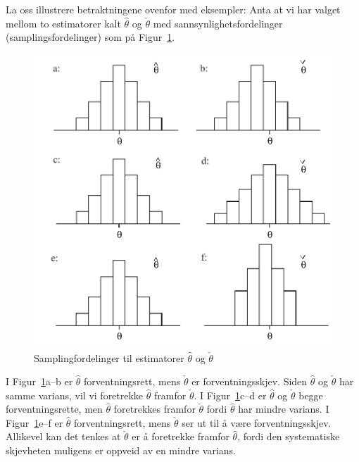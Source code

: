 La oss illustrere betraktningene ovenfor med eksempler: Anta at
vi har valget mellom to estimatorer kalt $\hat{\theta}$ og
 $\check{\theta}$ med
sannsynlighetsfordelinger (samplingsfordelinger) som på Figur~\ref{fig:samplingfordeling}.

\begin{figure}[ht]
\centering
\includegraphics[scale=0.8]{figurer/fig7_1.pdf}
    \caption{Samplingfordelinger til estimatorer $\hat{\theta}$ og $\check{\theta}$}
	\label{fig:samplingfordeling}
\end{figure}                                                               
\noindent I Figur~\ref{fig:samplingfordeling}a--b er $\hat{\theta}$ forventningsrett, mens
 $\check{\theta}$ er forventningsskjev. Siden $ \hat{\theta} $ og 
$\check{\theta} $ har
samme varians, vil vi foretrekke $\hat{\theta}$ framfor $\check{\theta}$.
I Figur~\ref{fig:samplingfordeling}c--d er $\hat{\theta}$ og $\check{\theta}$ begge forventningsrette,
 men $\hat{\theta} $ foretrekkes framfor $\check{\theta}$ fordi $\hat{\theta}$
 har mindre varians.
I Figur~\ref{fig:samplingfordeling}e--f er $\hat{\theta}$ forventningsrett, mens $\check{\theta}$
 ser ut til å være forventningsskjev. Allikevel kan det tenkes at
 $\check{\theta}$ er å foretrekke framfor $ \hat{\theta} $, fordi den
 systematiske skjevheten muligens er oppveid av en mindre varians.

